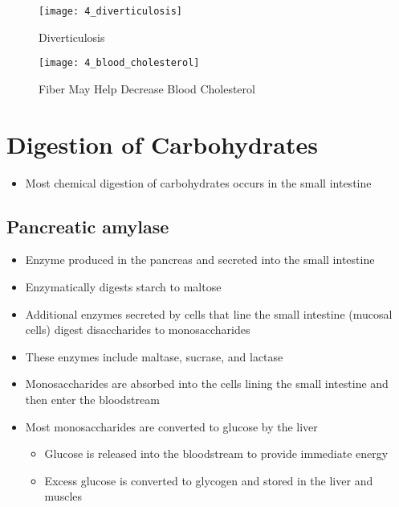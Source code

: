 \documentclass[title={Chapter 4}]{fdsn201notes}
\begin{document}
\begin{figure}[H]
	\centering
	\texttt{[image: 4\_diverticulosis]}
	\caption{Diverticulosis}
	\label{fig:diverticulosis}
\end{figure}

\begin{figure}[H]
	\centering
	\texttt{[image: 4\_blood\_cholesterol]}
	\caption{Fiber May Help Decrease Blood Cholesterol}
	\label{fig:fiber-blood-cholesterol}
\end{figure}

\section{Digestion of Carbohydrates}\label{sec:digestion-of-carbohydrates}
\begin{itemize}
	\item Most chemical digestion of carbohydrates occurs in the small intestine
\end{itemize}

\subsection{Pancreatic amylase}\label{subsec:pancreatic-amylase}
\begin{itemize}
	\item Enzyme produced in the pancreas and secreted into the small intestine
	\item Enzymatically digests starch to maltose
\end{itemize}

\begin{itemize}
	\item Additional enzymes secreted by cells that line the small intestine (mucosal cells) digest disaccharides to monosaccharides
	\item These enzymes include maltase, sucrase, and lactase
	\item Monosaccharides are absorbed into the cells lining the small intestine and then enter the bloodstream
	\item Most monosaccharides are converted to glucose by the liver
	\begin{itemize}
		\item Glucose is released into the bloodstream to provide immediate energy
		\item Excess glucose is converted to glycogen and stored in the liver and muscles
	\end{itemize}
\end{itemize}
\end{document}
